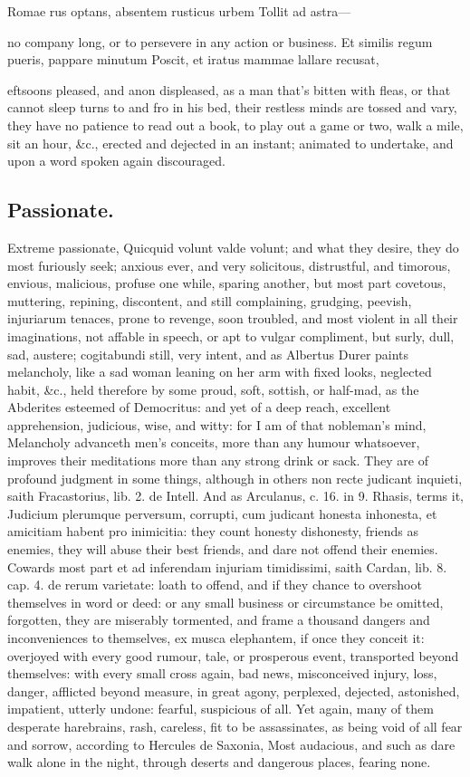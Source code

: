 {Romae rus optans, absentem rusticus urbem
Tollit ad astra---

no company long, or to persevere in any action or business.
Et similis regum pueris, pappare minutum
Poscit, et iratus mammae lallare recusat,

eftsoons pleased, and anon displeased, as a man that's bitten with
fleas, or that cannot sleep turns to and fro in his bed, their restless
minds are tossed and vary, they have no patience to read out a book, to
play out a game or two, walk a mile, sit an hour, \&c., erected and
dejected in an instant; animated to undertake, and upon a word spoken
again discouraged.

\subsection{Passionate.}
Extreme passionate, Quicquid volunt valde volunt; and
what they desire, they do most furiously seek; anxious ever, and very
solicitous, distrustful, and timorous, envious, malicious, profuse one
while, sparing another, but most part covetous, muttering, repining,
discontent, and still complaining, grudging, peevish, injuriarum
tenaces, prone to revenge, soon troubled, and most violent in all their
imaginations, not affable in speech, or apt to vulgar compliment, but
surly, dull, sad, austere; cogitabundi still, very intent, and as
 Albertus Durer paints melancholy, like a sad woman leaning on
her arm with fixed looks, neglected habit, \&c., held therefore by some
proud, soft, sottish, or half-mad, as the Abderites esteemed of
Democritus: and yet of a deep reach, excellent apprehension, judicious,
wise, and witty: for I am of that nobleman's mind, Melancholy
advanceth men's conceits, more than any humour whatsoever, improves
their meditations more than any strong drink or sack. They are of
profound judgment in some things, although in others non recte judicant
inquieti, saith Fracastorius, lib. 2. de Intell. And as Arculanus, c.
16. in 9. Rhasis, terms it, Judicium plerumque perversum, corrupti, cum
judicant honesta inhonesta, et amicitiam habent pro inimicitia: they
count honesty dishonesty, friends as enemies, they will abuse their
best friends, and dare not offend their enemies. Cowards most part et
ad inferendam injuriam timidissimi, saith Cardan, lib. 8. cap. 4. de
rerum varietate: loath to offend, and if they chance to overshoot
themselves in word or deed: or any small business or circumstance be
omitted, forgotten, they are miserably tormented, and frame a thousand
dangers and inconveniences to themselves, ex musca elephantem, if once
they conceit it: overjoyed with every good rumour, tale, or prosperous
event, transported beyond themselves: with every small cross again, bad
news, misconceived injury, loss, danger, afflicted beyond measure, in
great agony, perplexed, dejected, astonished, impatient, utterly
undone: fearful, suspicious of all. Yet again, many of them desperate
harebrains, rash, careless, fit to be assassinates, as being void of
all fear and sorrow, according to Hercules de Saxonia, Most
audacious, and such as dare walk alone in the night, through deserts
and dangerous places, fearing none.

}
